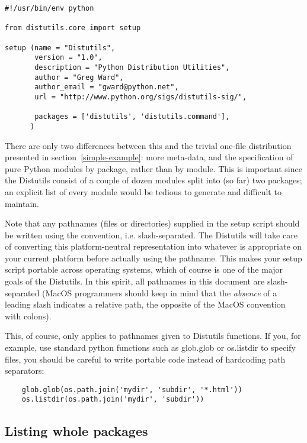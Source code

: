 \documentclass{howto}
\begin{document}
\begin{verbatim}
#!/usr/bin/env python

from distutils.core import setup

setup (name = "Distutils",
       version = "1.0",
       description = "Python Distribution Utilities",
       author = "Greg Ward",
       author_email = "gward@python.net",
       url = "http://www.python.org/sigs/distutils-sig/",

       packages = ['distutils', 'distutils.command'],
      )
\end{verbatim}
There are only two differences between this and the trivial one-file
distribution presented in section~\ref{simple-example}: more
meta-data, and the specification of pure Python modules by package,
rather than by module.  This is important since the Distutils consist of
a couple of dozen modules split into (so far) two packages; an explicit
list of every module would be tedious to generate and difficult to
maintain.

Note that any pathnames (files or directories) supplied in the setup
script should be written using the \UNIX{} convention, i.e.
slash-separated.  The Distutils will take care of converting this
platform-neutral representation into whatever is appropriate on your
current platform before actually using the pathname.  This makes your
setup script portable across operating systems, which of course is one
of the major goals of the Distutils.  In this spirit, all pathnames in
this document are slash-separated (MacOS programmers should keep in
mind that the \emph{absence} of a leading slash indicates a relative
path, the opposite of the MacOS convention with colons).

This, of course, only applies to pathnames given to Distutils functions.
If you, for example, use standard python functions such as glob.glob
or os.listdir to specify files, you should be careful to write portable
code instead of hardcoding path separators:
\begin{verbatim}
    glob.glob(os.path.join('mydir', 'subdir', '*.html'))
    os.listdir(os.path.join('mydir', 'subdir'))
\end{verbatim}

\subsection{Listing whole packages}
\label{listing-packages}
\end{document}
